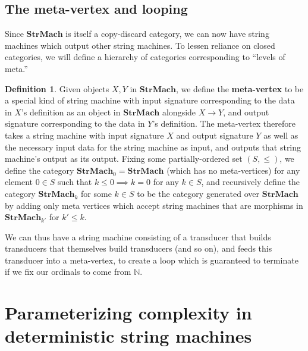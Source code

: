 \documentclass{article}
\theoremstyle{definition}
\newtheorem{definition}{Definition}[section]
\theoremstyle{remark}
\begin{document}
\subsection{The meta-vertex and looping}
Since $\textbf{StrMach}$ is itself a copy-discard category, we can
now have string machines which output other string machines. To lessen
reliance on closed categories, we will define a hierarchy of categories
corresponding to ``levels of meta.''
\begin{definition}
    \label{def:metavertex}
    Given objects $X,Y$ in $\mathbf{StrMach}$, we define
    the \textbf{meta-vertex} to be a special
    kind of string machine with input signature
    corresponding to the data in $X$'s definition as
    an object in $\mathbf{StrMach}$ alongside $X\to Y$, and output
    signature corresponding to the data in $Y$'s definition. The
    meta-vertex therefore takes a string machine with input
    signature $X$ and output signature $Y$ as well as the necessary
    input data for the string machine as input, and outputs that
    string machine's output as its output. Fixing some partially-ordered
    set $(S,\leq)$, we define the category $\mathbf{StrMach}_0=
    \mathbf{StrMach}$ (which has no meta-vertices) for any
    element $0 \in S$ such that $k\leq 0 \implies k=0$ for
    any $k\in S$,
    and recursively define
    the category $\mathbf{StrMach}_k$ for some
    $k \in S$ to be the category generated over
    $\mathbf{StrMach}$ by adding only meta vertices which 
    accept string machines that are morphisms in
    $\mathbf{StrMach}_{k'}$ for $k' \leq k$.
\end{definition}

We can thus have a string
machine consisting of a transducer that builds transducers that
themselves build transducers (and so on), and feeds this transducer
into a meta-vertex, to create a loop which is guaranteed to terminate if
we fix our ordinals to come from $\mathbb{N}$.

\section{Parameterizing complexity in
deterministic string machines}
\label{sec:paramcomplexity}
\end{document}
